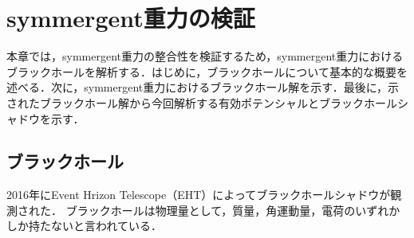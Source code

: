 \chapter{symmergent重力の検証}
本章では，symmergent重力の整合性を検証するため，symmergent重力におけるブラックホールを解析する．はじめに，ブラックホールについて基本的な概要を述べる．次に，symmergent重力におけるブラックホール解を示す．最後に，示されたブラックホール解から今回解析する有効ポテンシャルとブラックホールシャドウを示す．
\section{ブラックホール}
\cite{Perlick:2021aok,1020588205192529152,Zakharov:2005ek,Tsukamoto:2024gkz,Buoninfante:2024oxl,Ozsoy:2023ryl,Al-Badawi:2026ael,EventHorizonTelescope:2019dse,EventHorizonTelescope:2022wkp}
2016年にEvent Hrizon Telescope（EHT）によってブラックホールシャドウが観測された．
ブラックホールは物理量として，質量，角運動量，電荷のいずれかしか持たないと言われている．
